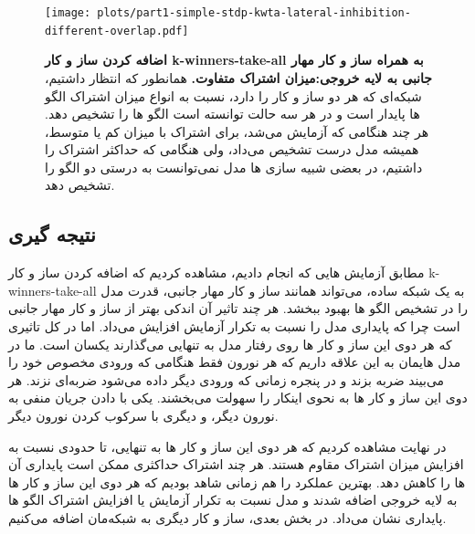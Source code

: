         \begin{figure}[!ht]
            \centering
            \texttt{[image: plots/part1-simple-stdp-kwta-lateral-inhibition-different-overlap.pdf]} 
            \captionsetup{width=.85\linewidth}
            \caption{\textbf{اضافه کردن ساز و کار 
            k-winners-take-all
            به همراه ساز و کار مهار جانبی به لایه خروجی:میزان اشتراک متفاوت. } 
            همانطور که انتظار داشتیم، شبکه‌ای که هر دو ساز و کار را دارد، نسبت به انواع میزان اشتراک الگو ها پایدار است و در هر سه حالت توانسته است الگو ها را تشخیص دهد. هر چند هنگامی که آزمایش می‌شد، برای اشتراک با میزان کم یا متوسط، همیشه مدل درست تشخیص می‌داد، ولی هنگامی که حداکثر اشتراک را داشتیم، در بعضی شبیه سازی ها مدل نمی‌توانست به درستی دو الگو را تشخیص دهد.
            }
            \label{fig:part1-simple-stdp-kwta-lateral-inhibition-different-overlap}
        \end{figure}

    \subsection*{نتیجه گیری}
        مطابق آزمایش هایی که انجام دادیم، مشاهده کردیم که اضافه کردن ساز و کار 
        k-winners-take-all 
        به یک شبکه ساده، می‌تواند همانند ساز و کار مهار جانبی، قدرت مدل را در تشخیص الگو ها بهبود ببخشد. هر چند تاثیر آن اندکی بهتر از ساز و کار مهار جانبی است چرا که پایداری مدل را نسبت به تکرار آزمایش افزایش می‌داد. اما در کل تاثیری که هر دوی این ساز و کار ها روی رفتار مدل به تنهایی می‌گذارند یکسان است. ما در مدل هایمان به این علاقه داریم که هر نورون فقط هنگامی که ورودی مخصوص خود را می‌بیند ضربه بزند و در پنجره زمانی که ورودی دیگر داده می‌شود ضربه‌ای نزند. هر دوی این ساز و کار ها به نحوی اینکار را سهولت می‌بخشند. یکی با دادن جریان منفی به نورون دیگر، و دیگری با سرکوب کردن نورون دیگر.

        در نهایت مشاهده کردیم که هر دوی این ساز و کار ها به تنهایی، تا حدودی نسبت به افزایش میزان اشتراک مقاوم هستند. هر چند اشتراک حداکثری ممکن است پایداری آن ها را کاهش دهد. بهترین عملکرد را هم زمانی شاهد بودیم که هر دوی این ساز و کار ها به لایه خروجی اضافه شدند و مدل نسبت به تکرار آزمایش یا افزایش اشتراک الگو ها پایداری نشان می‌داد. در بخش بعدی، ساز و کار دیگری به شبکه‌مان اضافه می‌کنیم.